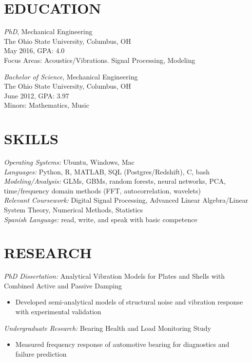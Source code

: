 \documentclass[margin]{res}
\begin{document}
\begin{resume}
\section{EDUCATION} 
               {\sl PhD}, Mechanical Engineering \\
                The Ohio State University, Columbus, OH \\
                May 2016, GPA: 4.0 \\
                Focus Areas: Acoustics/Vibrations. Signal Processing, Modeling

                {\sl Bachelor of Science}, Mechanical Engineering \\
                The Ohio State University, Columbus, OH \\ 
                June 2012, GPA: 3.97 \\ 
                Minors: Mathematics, Music 
 
 
\section{SKILLS} 
               {\sl Operating Systems:} Ubuntu, Windows, Mac \\ 
               {\sl Languages:} Python, R, MATLAB, SQL (Postgres/Redshift), C, bash\\
               {\sl Modeling/Analysis:} GLMs, GBMs, random forests, neural networks, 
                    PCA, time/frequency domain methods (FFT, autocorrelation, 
                    wavelets) \\
               {\sl Relevant Coursework:} Digital Signal Processing, Advanced Linear 
                    Algebra/Linear System Theory, Numerical Methods, Statistics \\ 
               {\sl Spanish Language:} read, write, and speak with basic competence


\section{RESEARCH}
               {\sl PhD Dissertation:} Analytical Vibration Models for Plates and
                    Shells with Combined Active and Passive Damping
               \begin{itemize}
               \item Developed semi-analytical models of structural noise and
                     vibration response with experimental validation
               \end{itemize}
               {\sl Undergraduate Research:} Bearing Health and Load Monitoring Study
               \begin{itemize}
               \item Measured frequency response of automotive bearing for
                     diagnostics and failure prediction
               \end{itemize}


\end{resume}
\end{document}
